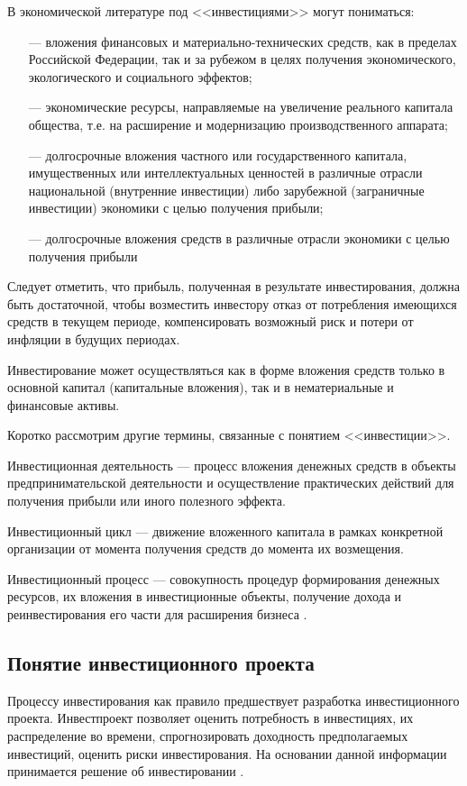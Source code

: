 В экономической литературе под <<инвестициями>> могут пониматься:
\begin{enumerate}
	\item [---] вложения финансовых и материально-технических средств, как в пределах Российской Федерации, так и за рубежом в целях получения экономического, экологического и социального эффектов;
	\item [---] экономические ресурсы, направляемые на увеличение реального капитала общества, т.е. на расширение и модернизацию производственного аппарата;
	\item [---] долгосрочные вложения частного или государственного капитала, имущественных или интеллектуальных ценностей в различные отрасли национальной (внутренние инвестиции) либо зарубежной (заграничные инвестиции) экономики с целью получения прибыли;
	\item [---] долгосрочные вложения средств в различные отрасли экономики с целью получения прибыли \cite[с. 9]{askinaji}
\end{enumerate}

Следует отметить, что прибыль, полученная в результате инвестирования, должна быть достаточной, чтобы возместить инвестору отказ от потребления имеющихся средств в текущем периоде, компенсировать возможный риск и потери от инфляции в будущих периодах.

Инвестирование может осуществляться как в форме вложения средств только в основной капитал (капитальные вложения), так и в нематериальные и финансовые активы.

Коротко рассмотрим другие термины, связанные с понятием <<инвестиции>>.

Инвестиционная деятельность --- процесс вложения денежных средств в объекты предпринимательской деятельности и осуществление практических действий для получения прибыли или иного полезного эффекта.

Инвестиционный цикл --- движение вложенного капитала в рамках конкретной организации от момента получения средств до момента их возмещения.

Инвестиционный процесс --- совокупность процедур формирования денежных ресурсов, их вложения в инвестиционные объекты, получение дохода и реинвестирования его части для расширения бизнеса \cite[с. 80-83]{leontev}.

\subsection{Понятие инвестиционного проекта}
Процессу инвестирования как правило предшествует разработка инвестиционного проекта. Инвестпроект позволяет оценить потребность в инвестициях, их распределение во времени, спрогнозировать доходность предполагаемых инвестиций, оценить риски инвестирования. На основании данной информации принимается решение об инвестировании \cite[с. 82]{borisova}.

